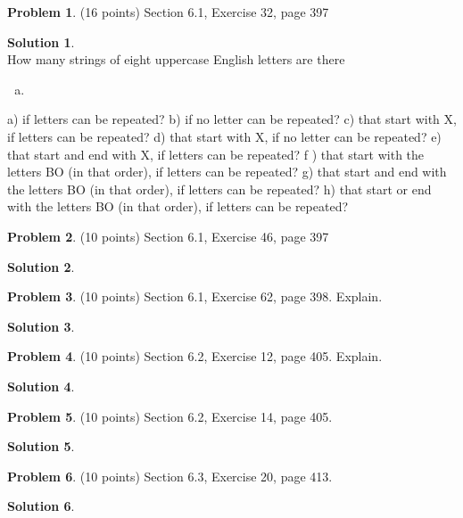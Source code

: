 \documentclass{article}
\theoremstyle{definition}
\newtheorem{problem}{Problem}
\newtheorem*{solution}{Solution}
\begin{document}
\begin{problem} (16 points) 
Section 6.1, Exercise 32, page 397
\end{problem}
\begin{solution} \ \\
How many strings of eight uppercase English letters are
there
\begin{enumerate}[a)]
  \item 
\end{enumerate}
a) if letters can be repeated?
b) if no letter can be repeated?
c) that start with X, if letters can be repeated?
d) that start with X, if no letter can be repeated?
e) that start and end with X, if letters can be repeated?
f ) that start with the letters BO (in that order), if letters
can be repeated?
g) that start and end with the letters BO (in that order),
if letters can be repeated?
h) that start or end with the letters BO (in that order), if
letters can be repeated? 
\end{solution}

\begin{problem} (10 points) 
Section 6.1, Exercise 46, page 397
\end{problem}
\begin{solution} 
\end{solution}

\begin{problem} (10 points) 
Section 6.1, Exercise 62, page 398.  Explain.
\end{problem}
\begin{solution} 
\end{solution}

\begin{problem} (10 points) 
Section 6.2, Exercise 12, page 405.  Explain.
\end{problem}
\begin{solution} 
\end{solution}

\begin{problem} (10 points) 
Section 6.2, Exercise 14, page 405.
\end{problem}
\begin{solution} 
\end{solution}

\begin{problem} (10 points) 
Section 6.3, Exercise 20, page 413.
\end{problem}
\begin{solution} 
\end{solution}
\end{document}
